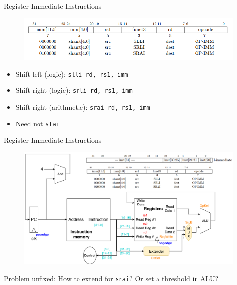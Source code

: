 \documentclass{myslide}
\begin{document}
\begin{frame}[fragile]{Register-Immediate Instructions}
\begin{figure}
\centering
\includegraphics[width=\linewidth]{fig/Lecture2/r-i_2.PNG}
\end{figure}
\begin{itemize}
	\item Shift left (logic): \verb'slli rd, rs1, imm'
	\item Shift right (logic): \verb'srli rd, rs1, imm'
	\item Shift right (arithmetic): \verb'srai rd, rs1, imm'
	\item Need not \verb'slai'
\end{itemize}
\end{frame}

\begin{frame}[fragile]{Register-Immediate Instructions}
\begin{figure}
\centering
\includegraphics[width=\linewidth]{fig/Lecture2/Datapath-R-I_2.pdf}
\end{figure}
Problem unfixed: How to extend for \verb'srai'? Or set a threshold in ALU?
\end{frame}
\end{document}
